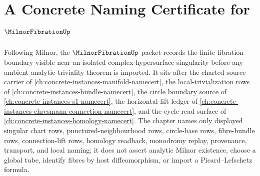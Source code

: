 \chapter{A Concrete Naming Certificate for $\MilnorFibrationUp$}
\label{ch:concrete-instances-milnor-fibration-namecert}

Following Milnor, the $\MilnorFibrationUp$ packet records the finite fibration boundary visible near an isolated complex hypersurface singularity before any ambient analytic triviality theorem is imported. It sits after the charted source carrier of \autoref{ch:concrete-instances-manifold-namecert}, the local-trivialization rows of \autoref{ch:concrete-instances-bundle-namecert}, the circle boundary source of \autoref{ch:concrete-instances-s1-namecert}, the horizontal-lift ledger of \autoref{ch:concrete-instances-ehresmann-connection-namecert}, and the cycle-read surface of \autoref{ch:concrete-instances-homology-namecert}. The chapter names only displayed singular chart rows, punctured-neighbourhood rows, circle-base rows, fibre-bundle rows, connection-lift rows, homology readback, monodromy replay, provenance, transport, and local naming; it does not assert analytic Milnor existence, choose a global tube, identify fibres by host diffeomorphism, or import a Picard--Lefschetz formula.

